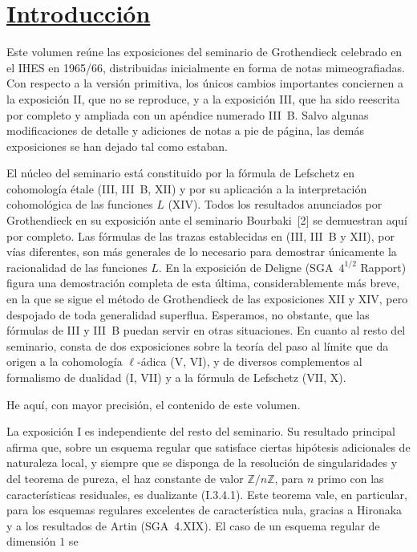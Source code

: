 \thispagestyle{empty}
\section*{\uline{Introducción}}

Este volumen reúne las exposiciones del seminario de Grothendieck celebrado en el IHES en 1965/66, distribuidas inicialmente en forma de notas mimeografiadas. Con respecto a la versión primitiva, los únicos cambios importantes conciernen a la exposición II, que no se reproduce, y a la exposición III, que ha sido reescrita por completo y ampliada con un apéndice numerado III~B. Salvo algunas modificaciones de detalle y adiciones de notas a pie de página, las demás exposiciones se han dejado tal como estaban.

El núcleo del seminario está constituido por la fórmula de Lefschetz en cohomología étale (III, III~B, XII) y por su aplicación a la interpretación cohomológica de las funciones $L$ (XIV). Todos los resultados anunciados por Grothendieck en su exposición ante el seminario Bourbaki~[2] se demuestran aquí por completo. Las fórmulas de las trazas establecidas en (III, III~B y XII), por vías diferentes, son más generales de lo necesario para demostrar únicamente la racionalidad de las funciones $L$. En la exposición de Deligne (SGA~$4^{1/2}$ Rapport) figura una demostración completa de esta última, considerablemente más breve, en la que se sigue el método de Grothendieck de las exposiciones XII y XIV, pero despojado de toda generalidad superflua. Esperamos, no obstante, que las fórmulas de III y III~B puedan servir en otras situaciones. En cuanto al resto del seminario, consta de dos exposiciones sobre la teoría del paso al límite que da origen a la cohomología $\ell$-ádica (V, VI), y de diversos complementos al formalismo de dualidad (I, VII) y a la fórmula de Lefschetz (VII, X).

He aquí, con mayor precisión, el contenido de este volumen.

La exposición I es independiente del resto del seminario. Su resultado principal afirma que, sobre un esquema regular que satisface ciertas hipótesis adicionales de naturaleza local, y siempre que se disponga de la resolución de singularidades y del teorema de pureza, el haz constante de valor $\mathbb Z/n\mathbb Z$, para $n$ primo con las características residuales, es dualizante (I.3.4.1). Este teorema vale, en particular, para los esquemas regulares excelentes de característica nula, gracias a Hironaka y a los resultados de Artin (SGA~4.XIX). El caso de un esquema regular de dimensión $1$ se

